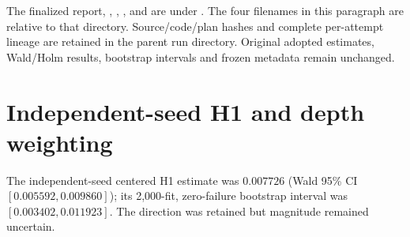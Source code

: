 \documentclass[pdflatex,sn-basic,Numbered]{sn-jnl}
\begin{document}
The finalized report, , , , and  are under . The four filenames in this paragraph are relative to that directory. Source/code/plan hashes and complete per-attempt lineage are retained in the parent run directory. Original adopted estimates, Wald/Holm results, bootstrap intervals and frozen metadata remain unchanged.

\section{Independent-seed H1 and depth weighting}

The independent-seed centered H1 estimate was $0.007726$ (Wald 95\% CI $[0.005592,0.009860]$); its 2,000-fit, zero-failure bootstrap interval was $[0.003402,0.011923]$. The direction was retained but magnitude remained uncertain.

\begin{table}[t]
\centering\small
{}
\caption{Post-primary H1 depth contrasts and weighting summaries. Observation and matched-parameter weights are identical: 0.0625, 0.125, 0.1875, 0.25, and 0.375 at $D=1,2,3,4,6$. Intervals are unadjusted Wald 95\% intervals.}
\label{supp:tab:h1-depth}
\end{table}
\end{document}
